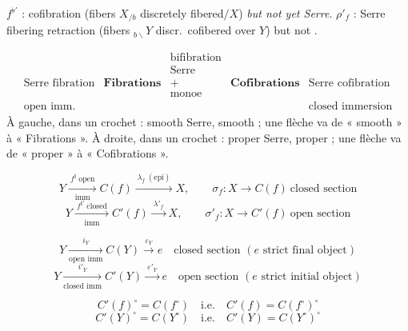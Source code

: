 \documentclass[11pt,a4paper]{article}
\begin{document}
$f^{\flat\prime}$ : cofibration (fibers $X_{/b}$ discretely fibered$/X$) \emph{but not yet Serre}. \quad $\rho'_f$ : Serre fibering retraction (fibers ${}_{b\backslash}Y$ discr.\ cofibered over $Y$) but not \ill{}.

\[
  \begin{array}{ccccc}
    & & \text{bifibration} & & \\
    & & \text{Serre} & & \\
    \text{Serre fibration} & \textbf{Fibrations} & + & \textbf{Cofibrations} & \text{Serre cofibration} \\
    & & \text{monoe} & & \\
    \text{open imm.} & & & & \text{closed immersion}
  \end{array}
\]
À gauche, dans un crochet : smooth Serre, smooth ; une flèche va de « smooth » à « Fibrations ». À droite, dans un crochet : proper Serre, proper ; une flèche va de « proper » à « Cofibrations ».

\[
  Y \xrightarrow[\text{imm}]{\ f^{\natural}\ \text{open}\ } C(f) \xrightarrow{\ \lambda_f\ (\text{epi})\ } X,
  \qquad \sigma_f : X \to C(f) \ \text{closed section}
\]
\[
  Y \xrightarrow[\text{imm}]{\ f^{\natural\prime}\ \text{closed}\ } C'(f) \xrightarrow{\ \lambda'_f\ } X,
  \qquad \sigma'_f : X \to C'(f) \ \text{open section}
\]

\[
  Y \xrightarrow[\text{open imm}]{\ i_Y\ } C(Y) \xrightarrow{\ \varepsilon_Y\ } e
  \quad \text{closed section } (e \text{ strict final object})
\]
\[
  Y \xrightarrow[\text{closed imm}]{\ i'_Y\ } C'(Y) \xrightarrow{\ \varepsilon'_Y\ } e
  \quad \text{open section } (e \text{ strict initial object})
\]

\[
  C'(f)^{\circ} = C(f^{\circ}) \quad \text{i.e.} \quad C'(f) = C(f^{\circ})^{\circ}
\]
\[
  C'(Y)^{\circ} = C(Y^{\circ}) \quad \text{i.e.} \quad C'(Y) = C(Y^{\circ})^{\circ}
\]

\end{document}
